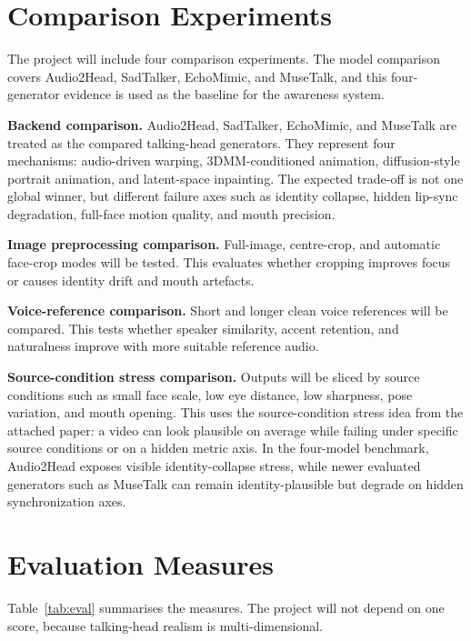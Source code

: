 \documentclass[10pt,conference]{IEEEtran}
\begin{document}
\section{Comparison Experiments}
The project will include four comparison experiments. The model comparison covers Audio2Head, SadTalker, EchoMimic, and MuseTalk, and this four-generator evidence is used as the baseline for the awareness system.

\textbf{Backend comparison.} Audio2Head, SadTalker, EchoMimic, and MuseTalk are treated as the compared talking-head generators. They represent four mechanisms: audio-driven warping, 3DMM-conditioned animation, diffusion-style portrait animation, and latent-space inpainting. The expected trade-off is not one global winner, but different failure axes such as identity collapse, hidden lip-sync degradation, full-face motion quality, and mouth precision.

\textbf{Image preprocessing comparison.} Full-image, centre-crop, and automatic face-crop modes will be tested. This evaluates whether cropping improves focus or causes identity drift and mouth artefacts.

\textbf{Voice-reference comparison.} Short and longer clean voice references will be compared. This tests whether speaker similarity, accent retention, and naturalness improve with more suitable reference audio.

\textbf{Source-condition stress comparison.} Outputs will be sliced by source conditions such as small face scale, low eye distance, low sharpness, pose variation, and mouth opening. This uses the source-condition stress idea from the attached paper: a video can look plausible on average while failing under specific source conditions or on a hidden metric axis. In the four-model benchmark, Audio2Head exposes visible identity-collapse stress, while newer evaluated generators such as MuseTalk can remain identity-plausible but degrade on hidden synchronization axes.

\section{Evaluation Measures}
Table~\ref{tab:eval} summarises the measures. The project will not depend on one score, because talking-head realism is multi-dimensional.
\end{document}
